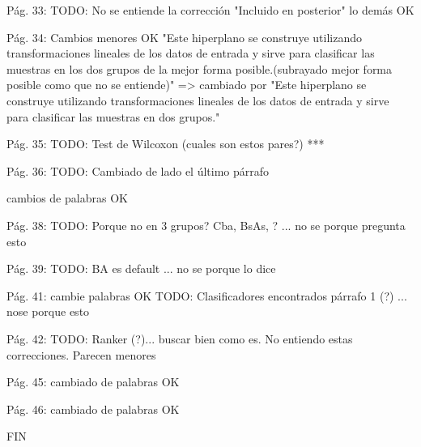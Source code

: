 Pág. 33: 
TODO: No se entiende la corrección "Incluido en posterior"
lo demás OK

Pág. 34:
Cambios menores OK
"Este hiperplano se construye utilizando transformaciones lineales de los datos de entrada y sirve para clasificar las muestras en los dos grupos de la mejor forma posible.(subrayado mejor forma posible como que no se entiende)" => cambiado por 
"Este hiperplano se construye utilizando transformaciones lineales de los datos de entrada y sirve para clasificar las muestras en dos grupos."

Pág. 35:
TODO: Test de Wilcoxon (cuales son estos pares?) ***

Pág. 36:
TODO: Cambiado de lado el último párrafo 

cambios de palabras OK

Pág. 38: 
TODO: Porque no en 3 grupos? Cba, BsAs, ? ... no se porque pregunta esto

Pág. 39: 
TODO: BA es default ... no se porque lo dice

Pág. 41: cambie palabras OK
TODO: Clasificadores encontrados párrafo 1 (?) ... nose porque esto

Pág. 42: 
TODO: Ranker (?)... buscar bien como es.
No entiendo estas correcciones. Parecen menores

Pág. 45:
cambiado de palabras OK

Pág. 46:
cambiado de palabras OK

FIN
